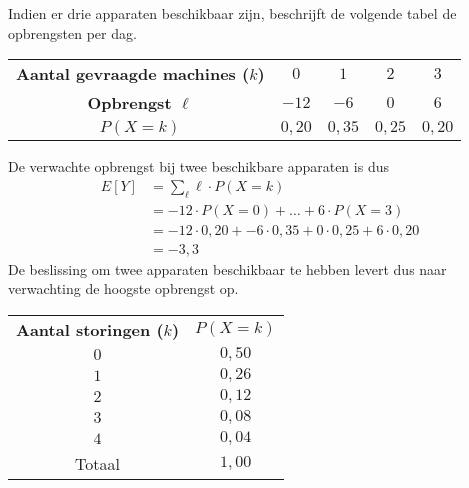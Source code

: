 \begin{enumerate}[label=(\alph*)]
{            Indien er drie apparaten beschikbaar zijn, beschrijft de volgende tabel de opbrengsten per dag.

            \begin{center}
                \begin{tabular}{ccccc}
                    \toprule
                        {\bfseries Aantal gevraagde machines ($k$)} & $0$ & $1$ & $2$ & $3$ \\        
                        \cmidrule{1-1} \cmidrule{2-2} \cmidrule{3-3} \cmidrule{4-4} \cmidrule{5-5}
                        {\bfseries Opbrengst $\ell$} & $-12$ & $-6$ & $0$ & $6$ \\        
                        \cmidrule{1-1} \cmidrule{2-2} \cmidrule{3-3} \cmidrule{4-4} \cmidrule{5-5}
                        {\bfseries $P(X=k)$} & $0,20$ & $0,35$ & $0,25$ & $0,20$ \\
                    \bottomrule
                \end{tabular}
            \end{center}
            De verwachte opbrengst bij twee beschikbare apparaten is dus
            \begin{align*}
                E[Y]    &= \sum_\ell \ell \cdot P(X=k) \\
                        &=  -12 \cdot P(X=0) + \ldots + 6 \cdot P(X=3) \\
                        &= -12 \cdot 0,20 + -6 \cdot 0,35 + 0 \cdot 0,25 + 6 \cdot 0,20 \\
                        &= -3,3
            \end{align*}
            De beslissing om twee apparaten beschikbaar te hebben levert dus naar verwachting de hoogste opbrengst op.
        }
\end{enumerate}


\begin{center}
    \begin{tabular}{cc}
        \toprule
            {\bfseries Aantal storingen ($k$)} & {\bfseries $P(X=k)$} \\        
        \cmidrule{1-1} \cmidrule{2-2}
            $0$ & $0,50$ \\
            $1$ & $0,26$ \\
            $2$ & $0,12$ \\
            $3$ & $0,08$ \\
            $4$ & $0,04$ \\
        \cmidrule{1-1} \cmidrule{2-2}
            Totaal & $1,00$ \\ 
        \bottomrule
    \end{tabular}
\end{center}


